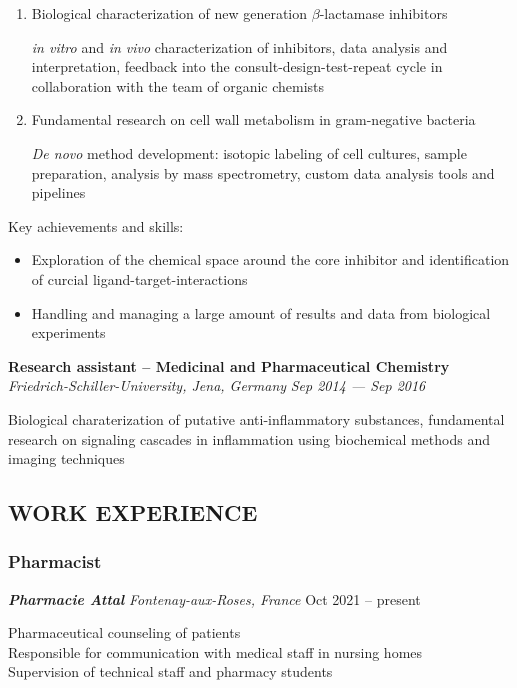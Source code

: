 \documentclass[
  letterpaper,
  DIV=11,
  numbers=noendperiod]{scrartcl}
\providecommand{\tightlist}{%
  \setlength{\itemsep}{0pt}\setlength{\parskip}{0pt}}\usepackage{longtable,booktabs,array}
\begin{document}
\begin{enumerate}
\def\labelenumi{\arabic{enumi})}
\item
  Biological characterization of new generation $β$-lactamase inhibitors

  \emph{in vitro} and \emph{in vivo} characterization of inhibitors,
  data analysis and interpretation, feedback into the
  consult-design-test-repeat cycle in collaboration with the team of
  organic chemists
\item
  Fundamental research on cell wall metabolism in gram-negative bacteria

  \emph{De novo} method development: isotopic labeling of cell cultures,
  sample preparation, analysis by mass spectrometry, custom data
  analysis tools and pipelines
\end{enumerate}

Key achievements and skills:

\begin{itemize}
\tightlist
\item
  Exploration of the chemical space around the core inhibitor and
  identification of curcial ligand-target-interactions
\item
  Handling and managing a large amount of results and data from
  biological experiments
\end{itemize}

\textbf{Research assistant -- Medicinal and Pharmaceutical Chemistry}
\emph{Friedrich-Schiller-University, Jena, Germany} {\emph{Sep 2014 ---
Sep 2016}}

Biological charaterization of putative anti-inflammatory substances,
fundamental research on signaling cascades in inflammation using
biochemical methods and imaging techniques

\subsection{WORK EXPERIENCE}\label{work-experience}

\subsubsection{Pharmacist}\label{pharmacist}

\textbf{\emph{Pharmacie Attal}} \emph{Fontenay-aux-Roses, France} {Oct
2021 -- present}

Pharmaceutical counseling of patients\\
Responsible for communication with medical staff in nursing homes\\
Supervision of technical staff and pharmacy students
\end{document}
